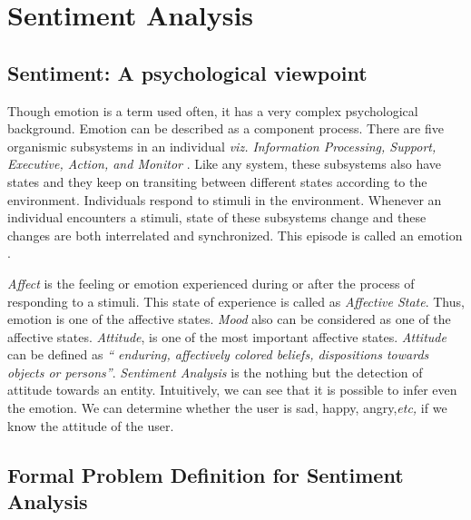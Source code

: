 
\chapter{Sentiment Analysis} %

\label{sa} %


\section{Sentiment: A psychological viewpoint}

\par
Though emotion is a term used often, it has a very complex psychological background. Emotion can be described as a component process. 
There are five organismic subsystems in an individual \textit{viz. Information Processing, Support, Executive, Action, and Monitor} 
\citep*{scherer2010blueprint}. Like any system, these subsystems also have states and they keep on transiting between different states
according to the environment. Individuals respond to stimuli in the environment. Whenever an individual encounters a stimuli,
state of these subsystems change and these changes are both interrelated and synchronized. This episode is called an emotion \citep*{scherer2005emotions}.

\par
\textit{Affect} is the feeling or emotion experienced during or after the process of responding to a stimuli. This state of experience is 
called as \textit{Affective State}. Thus, emotion is one of the affective states. \textit{Mood} also can be considered as one of the affective states.
\textit{Attitude}, is one of the most important affective states. \textit{Attitude} can be defined as \textit{`` enduring, affectively colored beliefs, dispositions
towards objects or persons''}\citep*{scherer2005emotions}. \textit{Sentiment Analysis} is the nothing but the detection of attitude towards
an entity. Intuitively, we can see that it is possible to infer even the emotion. We can determine whether the user is sad, happy,
angry,\textit{etc,} if we know the attitude of the user.


\section{Formal Problem Definition for Sentiment Analysis}

